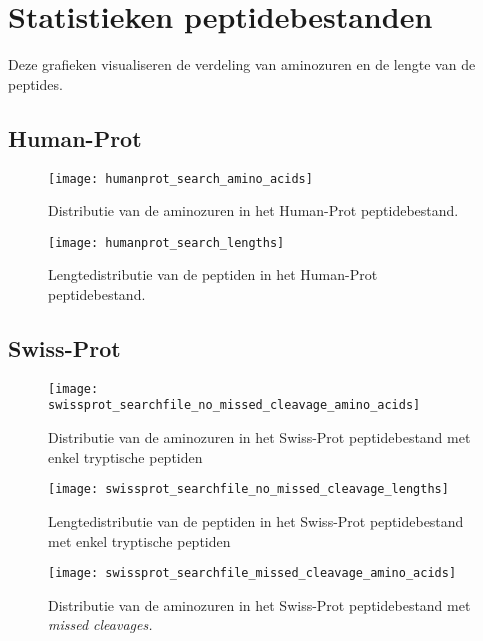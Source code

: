 \chapter{Statistieken peptidebestanden}\label{ch:appendix-statistieken-peptidebestanden}
Deze grafieken visualiseren de verdeling van aminozuren en de lengte van de peptides.

\section{Human-Prot}\label{sec:human-prot-stats}
\begin{figure}[H]
    \centering
    \texttt{[image: humanprot\_search\_amino\_acids]}
    \caption{Distributie van de aminozuren in het Human-Prot peptidebestand.}
    \label{fig:humanprot_search_amino_acids}
\end{figure}

\begin{figure}[H]
    \centering
    \texttt{[image: humanprot\_search\_lengths]}
    \caption{Lengtedistributie van de peptiden in het Human-Prot peptidebestand.}
    \label{fig:humanprot_search_distr}
\end{figure}

\section{Swiss-Prot}\label{sec:swiss-prot-stats}
\begin{figure}[H]
    \centering
    \texttt{[image: swissprot\_searchfile\_no\_missed\_cleavage\_amino\_acids]}
    \caption{Distributie van de aminozuren in het Swiss-Prot peptidebestand met enkel tryptische peptiden}
    \label{fig:swissprot_search_no_missed_cleavage_amino_acids}
\end{figure}

\begin{figure}[H]
    \centering
    \texttt{[image: swissprot\_searchfile\_no\_missed\_cleavage\_lengths]}
    \caption{Lengtedistributie van de peptiden in het Swiss-Prot peptidebestand met enkel tryptische peptiden}
    \label{fig:swissprot_search_no_missed_cleavage_distr}
\end{figure}

\begin{figure}[H]
    \centering
    \texttt{[image: swissprot\_searchfile\_missed\_cleavage\_amino\_acids]}
    \caption{Distributie van de aminozuren in het Swiss-Prot peptidebestand met \textit{missed cleavages.}}
    \label{fig:swissprot_search_missed_cleavage_amino_acids}
\end{figure}

